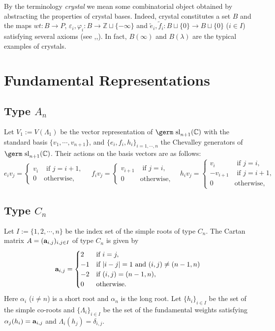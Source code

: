 By the terminology {\it crystal } we mean some combinatorial object 
obtained by abstracting the properties of crystal bases.
Indeed, crystal constitutes a set $B$ and the maps
$wt:B\longrightarrow P$, ${\varepsilon}_i,{\varphi}_i:B\longrightarrow {\mathbb Z}\sqcup\{-{\infty}\}$
and ${\tilde{e}_i},{\tilde{f}_i}:B\sqcup\{0\}\longrightarrow B\sqcup\{0\}$
($i\in I$) satisfying several axioms (see \cite{K3},\cite{NZ},\cite{N2}).
In fact, $B({\infty})$ and $B({\lambda})$ are the typical examples 
of crystals.

\section{Fundamental Representations}
\setcounter{equation}{0}

\subsection{Type $A_n$}

Let $V_1:=V({\Lambda}_1)$ be the vector representation of 
${\hbox{\germ sl}}_{n+1}({\mathbb C})$ with
the standard basis $\{v_1,{\cdots},v_{n+1}\}$, and 
$\{e_i,f_i,h_i\}_{i=1,{\cdots},n}$ the 
Chevalley generators of ${\hbox{\germ sl}}_{n+1}({\mathbb C})$.
Their actions on the basis vectors are as follows:
\begin{equation}
e_iv_j=\begin{cases}v_{i}&\text{ if }j=i+1,\\
0&\text{otherwise},
\end{cases}
{\quad}
f_iv_j=\begin{cases}v_{i+1}&\text{ if }j=i,\\
0&\text{otherwise},
\end{cases}
{\quad}
h_iv_j=\begin{cases}v_{i}&\text{ if }j=i,\\
-v_{i+1}&\text{ if }j=i+1,\\
0&\text{otherwise},
\end{cases}
\end{equation}

\subsection{Type $C_n$}

Let $I:=\{1,2,{\cdots} ,n\}$ be the index set of the 
simple roots of type $C_n$. The Cartan matrix 
$A=({\bf a}_{i,j})_{i,j\in I}$ of type 
$C_n$ is given by 
\[
 {\bf a}_{i,j}=\begin{cases}
2&\text{if }i=j,\\
-1&\text{if }|i-j|=1\text{ and }(i,j)\ne(n-1,n)\\
-2&\text{if }(i,j)=(n-1,n),\\
0&\text{otherwise}.
\end{cases}
\]
Here ${\alpha}_i$ ($i\ne n$) is a short root and 
${\alpha}_n$ is the long root.
Let $\{h_i\}_{i\in I}$ be the set of the simple co-roots
and $\{{\Lambda}_i\}_{i\in I}$ be the set of the fundamental 
weights satisfying ${\alpha}_j(h_i)={\bf a}_{i,j}$ 
and ${\Lambda}_i(h_j)={\delta}_{i,j}$.

